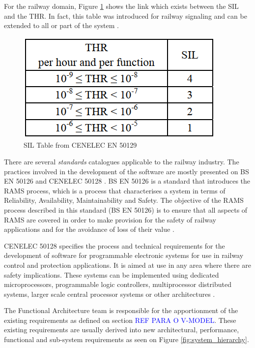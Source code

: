 For the railway domain, Figure \ref{fig:sillevels} shows the link which exists between the
SIL and the THR. In fact, this table was introduced for railway signaling and
can be extended to all or part of the system \cite{cenelec50128}.

\begin{figure}[H]
    \centering
    \includegraphics[scale=0.6]{images/SILlevels.PNG}
    \caption{SIL Table from CENELEC EN 50129}
    \label{fig:sillevels}
\end{figure}


There are several \textit{standards} catalogues applicable to the railway industry. The practices involved in the development of the software are mostly presented on BS EN 50126 \cite{en50126} and CENELEC 50128 \cite{cenelec50128}. BS EN 50126 is a standard that introduces the RAMS process, which is a process that characterises a system in terms of Reliability, Availability, Maintainability and Safety. The objective of the RAMS process described in this standard (BS EN 50126) is to ensure that all aspects of RAMS are covered in order to make provision for the safety of railway applications and for the avoidance of loss of their value \cite{en50126}. 

CENELEC 50128 specifies the process and technical requirements for the development of software for programmable electronic systems for use in railway control and protection applications. It is aimed at use in any area where there are safety implications. These systems can be implemented using dedicated microprocessors, programmable logic controllers, multiprocessor distributed systems, larger scale central processor systems or other architectures \cite{en50128_2}. 

The Functional Architecture team is responsible for the apportionment of the existing requirements as defined on section \textcolor{blue}{REF PARA O V-MODEL}. These existing requirements are usually derived into new architectural, performance, functional and sub-system requirements as seen on Figure \ref{fig:system_hierarchy}.\\

